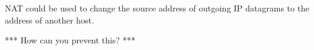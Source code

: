 NAT could be used to change the source address of outgoing IP datagrams to the address of another host.

*** How can you prevent this? ***
